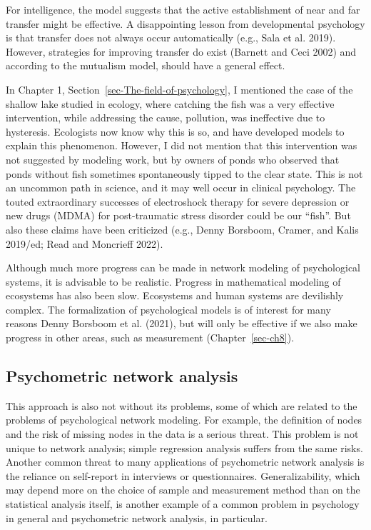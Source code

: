 \documentclass[
  a4paper,
  DIV=11,
  numbers=noendperiod,
  oneside]{scrreprt}
\begin{document}
For intelligence, the model suggests that the active establishment of
near and far transfer might be effective. A disappointing lesson from
developmental psychology is that transfer does not always occur
automatically (e.g., Sala et al. 2019). However, strategies for
improving transfer do exist (Barnett and Ceci 2002) and according to the
mutualism model, should have a general effect.

In Chapter 1, Section~\ref{sec-The-field-of-psychology}, I mentioned the
case of the shallow lake studied in ecology, where catching the fish was
a very effective intervention, while addressing the cause, pollution,
was ineffective due to hysteresis. Ecologists now know why this is so,
and have developed models to explain this phenomenon. However, I did not
mention that this intervention was not suggested by modeling work, but
by owners of ponds who observed that ponds without fish sometimes
spontaneously tipped to the clear state. This is not an uncommon path in
science, and it may well occur in clinical psychology. The touted
extraordinary successes of electroshock therapy for severe depression or
new drugs (MDMA) for post-traumatic stress disorder could be our
``fish''. But also these claims have been criticized (e.g., Denny
Borsboom, Cramer, and Kalis 2019/ed; Read and Moncrieff 2022).

Although much more progress can be made in network modeling of
psychological systems, it is advisable to be realistic. Progress in
mathematical modeling of ecosystems has also been slow. Ecosystems and
human systems are devilishly complex. The formalization of psychological
models is of interest for many reasons Denny Borsboom et al. (2021), but
will only be effective if we also make progress in other areas, such as
measurement (Chapter~\ref{sec-ch8}).

\hypertarget{sec-Psychometric-network-analysis}{%
\subsection{Psychometric network
analysis}\label{sec-Psychometric-network-analysis}}

This approach is also not without its problems, some of which are
related to the problems of psychological network modeling. For example,
the definition of nodes and the risk of missing nodes in the data is a
serious threat. This problem is not unique to network analysis; simple
regression analysis suffers from the same risks. Another common threat
to many applications of psychometric network analysis is the reliance on
self-report in interviews or questionnaires. Generalizability, which may
depend more on the choice of sample and measurement method than on the
statistical analysis itself, is another example of a common problem in
psychology in general and psychometric network analysis, in particular.
\end{document}
